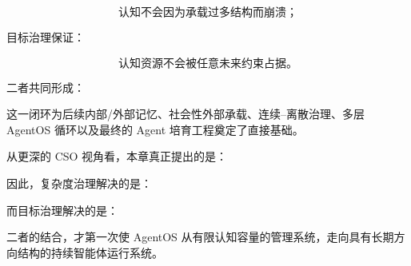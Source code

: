 \[
\text{认知不会因为承载过多结构而崩溃；}
\]

目标治理保证：

\[
\text{认知资源不会被任意未来约束占据。}
\]

二者共同形成：

\begin{statementbox}
\centering
{}
\end{statementbox}

这一闭环为后续内部/外部记忆、社会性外部承载、连续--离散治理、多层 AgentOS 循环以及最终的 Agent 培育工程奠定了直接基础。

从更深的 CSO 视角看，本章真正提出的是：

\begin{statementbox}
\centering
{}
\end{statementbox}

因此，复杂度治理解决的是：

\begin{statementbox}
\centering
{}
\end{statementbox}

而目标治理解决的是：

\begin{statementbox}
\centering
{}
\end{statementbox}

二者的结合，才第一次使 AgentOS 从有限认知容量的管理系统，走向具有长期方向结构的持续智能体运行系统。
